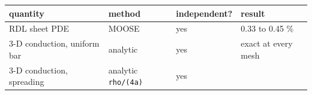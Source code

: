 \documentclass[10pt,]{article}
\begin{document}
\begin{longtable}[]{@{}llll@{}}
\toprule
\begin{minipage}[b]{0.22\columnwidth}\raggedright
quantity\strut
\end{minipage} & \begin{minipage}[b]{0.22\columnwidth}\raggedright
method\strut
\end{minipage} & \begin{minipage}[b]{0.22\columnwidth}\raggedright
independent?\strut
\end{minipage} & \begin{minipage}[b]{0.22\columnwidth}\raggedright
result\strut
\end{minipage}\tabularnewline
\midrule
\endhead
\begin{minipage}[t]{0.22\columnwidth}\raggedright
RDL sheet PDE\strut
\end{minipage} & \begin{minipage}[t]{0.22\columnwidth}\raggedright
MOOSE\strut
\end{minipage} & \begin{minipage}[t]{0.22\columnwidth}\raggedright
yes\strut
\end{minipage} & \begin{minipage}[t]{0.22\columnwidth}\raggedright
0.33 to 0.45 \%\strut
\end{minipage}\tabularnewline
\begin{minipage}[t]{0.22\columnwidth}\raggedright
3-D conduction, uniform bar\strut
\end{minipage} & \begin{minipage}[t]{0.22\columnwidth}\raggedright
analytic\strut
\end{minipage} & \begin{minipage}[t]{0.22\columnwidth}\raggedright
yes\strut
\end{minipage} & \begin{minipage}[t]{0.22\columnwidth}\raggedright
exact at every mesh\strut
\end{minipage}\tabularnewline
\begin{minipage}[t]{0.22\columnwidth}\raggedright
3-D conduction, spreading\strut
\end{minipage} & \begin{minipage}[t]{0.22\columnwidth}\raggedright
analytic \texttt{rho/(4a)}\strut
\end{minipage} & \begin{minipage}[t]{0.22\columnwidth}\raggedright
yes\strut
\end{minipage} & \begin{minipage}[t]{0.22\columnwidth}\raggedright

\end{minipage}
\end{longtable}
\end{document}
